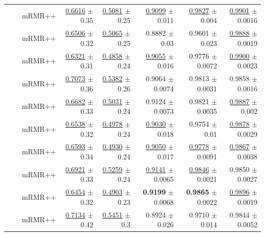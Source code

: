 \begin{longtable}{llp{}rrrrr}
 &  & mRMR++ & \underline{0.6616} {\scriptsize $\pm$ 0.35} & \underline{0.5081} {\scriptsize $\pm$ 0.25} & \underline{0.9099} {\scriptsize $\pm$ 0.011} & \underline{0.9827} {\scriptsize $\pm$ 0.004} & \underline{0.9901} {\scriptsize $\pm$ 0.0016} \\
 &  & mRMR++ & \underline{0.6506} {\scriptsize $\pm$ 0.32} & \underline{0.5065} {\scriptsize $\pm$ 0.25} & 0.8882 {\scriptsize $\pm$ 0.03} & 0.9601 {\scriptsize $\pm$ 0.023} & \underline{0.9888} {\scriptsize $\pm$ 0.0019} \\
 &  & mRMR++ & \underline{0.6321} {\scriptsize $\pm$ 0.31} & \underline{0.4858} {\scriptsize $\pm$ 0.24} & \underline{0.9055} {\scriptsize $\pm$ 0.016} & 0.9776 {\scriptsize $\pm$ 0.0072} & \underline{0.9900} {\scriptsize $\pm$ 0.0023} \\
 &  & mRMR++ & \underline{0.7073} {\scriptsize $\pm$ 0.36} & \underline{0.5382} {\scriptsize $\pm$ 0.26} & 0.9064 {\scriptsize $\pm$ 0.0074} & 0.9813 {\scriptsize $\pm$ 0.0031} & 0.9858 {\scriptsize $\pm$ 0.0016} \\
 &  & mRMR++ & \underline{0.6682} {\scriptsize $\pm$ 0.33} & \underline{0.5031} {\scriptsize $\pm$ 0.24} & 0.9124 {\scriptsize $\pm$ 0.0073} & 0.9821 {\scriptsize $\pm$ 0.0035} & \underline{0.9887} {\scriptsize $\pm$ 0.002} \\
 &  & mRMR++ & \underline{0.6538} {\scriptsize $\pm$ 0.32} & \underline{0.4978} {\scriptsize $\pm$ 0.24} & \underline{0.9030} {\scriptsize $\pm$ 0.018} & 0.9754 {\scriptsize $\pm$ 0.01} & \underline{0.9878} {\scriptsize $\pm$ 0.0029} \\
 &  & mRMR++ & \underline{0.6593} {\scriptsize $\pm$ 0.34} & \underline{0.4930} {\scriptsize $\pm$ 0.24} & \underline{0.9050} {\scriptsize $\pm$ 0.017} & \underline{0.9778} {\scriptsize $\pm$ 0.0091} & \underline{0.9867} {\scriptsize $\pm$ 0.0038} \\
 &  & mRMR++ & \underline{0.6921} {\scriptsize $\pm$ 0.33} & \underline{0.5259} {\scriptsize $\pm$ 0.24} & \underline{0.9141} {\scriptsize $\pm$ 0.0065} & \underline{0.9846} {\scriptsize $\pm$ 0.0021} & 0.9850 {\scriptsize $\pm$ 0.0027} \\
 &  & mRMR++ & \underline{0.6454} {\scriptsize $\pm$ 0.32} & \underline{0.4903} {\scriptsize $\pm$ 0.23} & \textbf{0.9199} {\scriptsize $\pm$ 0.0068} & \textbf{0.9865} {\scriptsize $\pm$ 0.0022} & \underline{0.9896} {\scriptsize $\pm$ 0.0019} \\
 &  & mRMR++ & \underline{0.7134} {\scriptsize $\pm$ 0.42} & \underline{0.5451} {\scriptsize $\pm$ 0.3} & 0.8924 {\scriptsize $\pm$ 0.026} & 0.9710 {\scriptsize $\pm$ 0.014} & 0.9844 {\scriptsize $\pm$ 0.0052} \\

\end{longtable}
